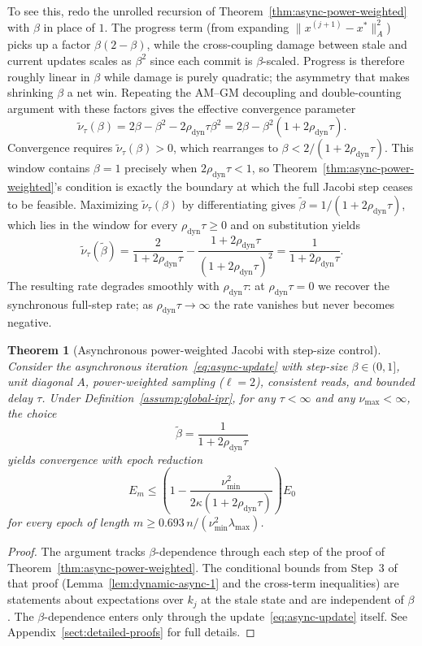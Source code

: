 \documentclass[pdflatex,sn-mathphys-num]{sn-jnl}%
\newcommand{\Anorm}[1]{\|#1\|_{A}}
\newcommand{\lmax}{\lambda_{\max}}
\theoremstyle{thmstyleone}%
\newtheorem{theorem}{Theorem}%
\theoremstyle{thmstyletwo}%
\theoremstyle{thmstylethree}%
\begin{document}
To see this, redo the unrolled recursion of
Theorem~\ref{thm:async-power-weighted} with $\beta$ in place of $1$. The
progress term (from expanding $\Anorm{x^{(j+1)} - x^*}^2$) picks up a
factor $\beta(2-\beta)$, while the cross-coupling damage between stale
and current updates scales as $\beta^2$ since each commit is
$\beta$-scaled. Progress is therefore roughly linear in $\beta$ while
damage is purely quadratic; the asymmetry that makes shrinking
$\beta$ a net win. Repeating the AM--GM decoupling and double-counting
argument with these factors gives the effective convergence parameter
\[
\tilde\nu_\tau(\beta) = 2\beta - \beta^2 - 2\rho_{\text{dyn}}\tau\beta^2
= 2\beta - \beta^2(1 + 2\rho_{\text{dyn}}\tau).
\]
Convergence requires $\tilde\nu_\tau(\beta) > 0$, which rearranges to
$\beta < 2/(1 + 2\rho_{\text{dyn}}\tau)$. This window contains
$\beta = 1$ precisely when $2\rho_{\text{dyn}}\tau < 1$, so
Theorem~\ref{thm:async-power-weighted}'s condition is exactly the
boundary at which the full Jacobi step ceases to be feasible.
Maximizing $\tilde\nu_\tau(\beta)$ by differentiating gives
$\tilde\beta = 1/(1 + 2\rho_{\text{dyn}}\tau)$, which lies in the
window for every $\rho_{\text{dyn}}\tau \geq 0$ and on substitution
yields
\[
\tilde\nu_\tau(\tilde\beta) = \frac{2}{1 + 2\rho_{\text{dyn}}\tau}
- \frac{1 + 2\rho_{\text{dyn}}\tau}{(1 + 2\rho_{\text{dyn}}\tau)^2}
= \frac{1}{1 + 2\rho_{\text{dyn}}\tau}.
\]
The resulting rate degrades smoothly with $\rho_{\text{dyn}}\tau$: at
$\rho_{\text{dyn}}\tau = 0$ we recover the synchronous full-step rate;
as $\rho_{\text{dyn}}\tau \to \infty$ the rate vanishes but never
becomes negative.

\begin{theorem}[Asynchronous power-weighted Jacobi with step-size control]
\label{thm:async-power-weighted-step}
Consider the asynchronous iteration~\eqref{eq:async-update} with step-size $\beta \in (0, 1]$, unit diagonal $A$, power-weighted sampling ($\ell = 2$), consistent reads, and bounded delay $\tau$. Under Definition~\ref{assump:global-ipr}, for any $\tau < \infty$ and any $\nu_{\max} < \infty$, the choice
$$
\tilde\beta = \frac{1}{1 + 2\rho_{\text{dyn}}\tau}
$$
yields convergence with epoch reduction
$$
E_m \leq \left(1 - \frac{\nu_{\min}^2}{2\kappa(1 + 2\rho_{\text{dyn}}\tau)}\right) E_0
$$
for every epoch of length $m \geq 0.693\,n/(\nu_{\min}^2\lmax)$.
\end{theorem}

\begin{proof}
The argument tracks $\beta$-dependence through each step of the proof of Theorem~\ref{thm:async-power-weighted}. The conditional bounds from Step~3 of that proof (Lemma~\ref{lem:dynamic-async-1} and the cross-term inequalities) are statements about expectations over $k_j$ at the stale state and are independent of $\beta$. The $\beta$-dependence enters only through the update~\eqref{eq:async-update} itself. See Appendix~\ref{sect:detailed-proofs} for full details.
\end{proof}
\end{document}
